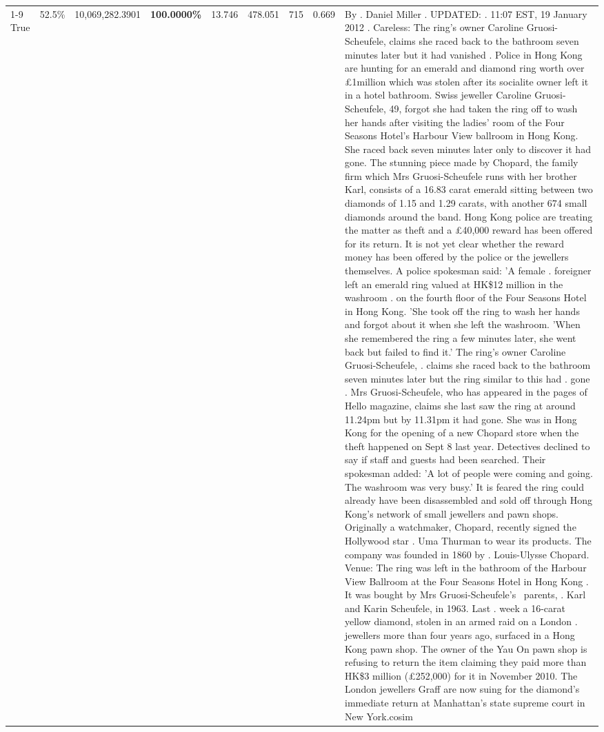\begin{table}[H]
\begin{tabular}{lllrlllll}
\cline{1-9}
True & 52.5\% & 10,069,282.3901 & \bfseries \color{red} 100.0000\% & 13.746 & 478.051 & 715 & 0.669 & By . Daniel Miller . UPDATED: . 11:07 EST, 19 January 2012 . Careless: The ring's owner Caroline Gruosi-Scheufele, claims she raced back to the bathroom seven minutes later but it had vanished . Police in Hong Kong are hunting for an emerald and diamond ring worth over £1million which was stolen after its socialite owner left it in a hotel bathroom. Swiss jeweller Caroline Gruosi-Scheufele, 49, forgot she had taken the ring off to wash her hands after visiting the ladies' room of the Four Seasons Hotel's Harbour View ballroom in Hong Kong. She raced back seven minutes later only to discover it had gone. The stunning piece made by Chopard, the family firm which Mrs Gruosi-Scheufele runs with her brother Karl, consists of a 16.83 carat emerald sitting between two diamonds of 1.15 and 1.29 carats, with another 674 small diamonds around the band. Hong Kong police are treating the matter as theft and a £40,000 reward has been offered for its return. It is not yet clear whether the reward money has been offered by the police or the jewellers themselves. A police spokesman said: 'A female . foreigner left an emerald ring valued at HK\$12 million in the washroom . on the fourth floor of the Four Seasons Hotel in Hong Kong. 'She took off the ring to wash her hands and forgot about it when she left the washroom. 'When she remembered the ring a few minutes later, she went back but failed to find it.' The ring's owner Caroline Gruosi-Scheufele, . claims she raced back to the bathroom seven minutes later but the ring similar to this had . gone . Mrs Gruosi-Scheufele, who has appeared in the pages of Hello magazine, claims she last saw the ring at around 11.24pm but by 11.31pm it had gone. She was in Hong Kong for the opening of a new Chopard store when the theft happened on Sept 8 last year. Detectives declined to say if staff and guests had been searched. Their spokesman added: 'A lot of people were coming and going. The washroom was very busy.' It is feared the ring could already have been disassembled and sold off through Hong Kong's network of small jewellers and pawn shops. Originally a watchmaker, Chopard, recently signed the Hollywood star . Uma Thurman to wear its products. The company was founded in 1860 by . Louis-Ulysse Chopard. Venue: The ring was left in the bathroom of the Harbour View Ballroom at the Four Seasons Hotel in Hong Kong . It was bought by Mrs Gruosi-Scheufele's  parents, . Karl and Karin Scheufele, in 1963. Last . week a 16-carat yellow diamond, stolen in an armed raid on a London . jewellers more than four years ago, surfaced in a Hong Kong pawn shop. The owner of the Yau On pawn shop is refusing to return the item claiming they paid more than HK\$3 million (£252,000) for it in November 2010. The London jewellers Graff are now suing for the diamond’s immediate return at Manhattan’s state supreme court in New York.cosim \\

\end{tabular}
\end{table}
